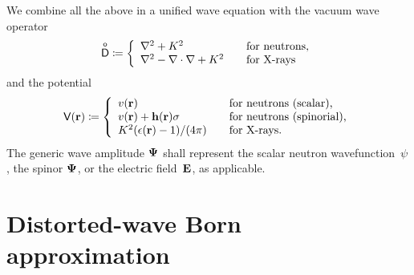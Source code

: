 We combine all the above in a unified wave equation
%
with the vacuum wave operator
%
%
\begin{equation}\label{EDo}
  \mathsf{\overset{o}{D}} \coloneqq \left\{ \begin{array}{ll}
      \mathbf{\nabla}^2 + K^2                     &\text{~~~for neutrons,}\\
      \mathbf{\nabla}^2 - \mathbf{\nabla}\cdot\mathbf{\nabla} + K^2 &\text{~~~for X-rays}
  \end{array}\right.
\end{equation}
%
and the potential
%
%
\begin{equation}\label{ETV}
  \mathsf{V}(\mathbf{r}) \coloneqq \left\{ \begin{array}{ll}
      v(\mathbf{r})                         &\text{~~~for neutrons (scalar),}\\
      v(\mathbf{r})+\mathbf{h}(\mathbf{r})\mathbf{\sigma}       &\text{~~~for neutrons (spinorial),}\\
      K^2(\epsilon(\mathbf{r})-1)/(4\pi) &\text{~~~for X-rays.}
  \end{array}\right.
\end{equation}
The generic wave amplitude $\mathbf{\Psi}$
%
shall represent
the scalar neutron wavefunction~$\psi$,
the spinor $\mathbf{\Psi}$, or the electric field~$\mathbf{E}$, as applicable.


\section{Distorted-wave Born approximation}\label{SDWBA}

